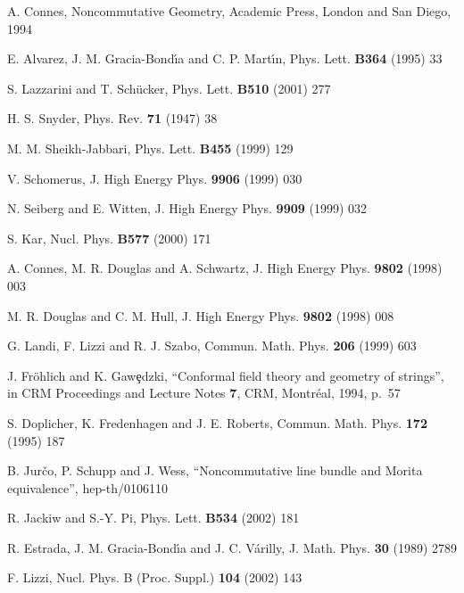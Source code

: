 \documentclass[a4paper,12pt]{article}
\providecommand{\1}{\mathbf{1}}         %
\providecommand{\7}{\dagger}            %
\providecommand{\8}{\bullet}            %
\renewcommand{\.}{\cdot}            %
\renewcommand{\:}{\colon}           %
\begin{document}
\begin{thebibliography}{92}
A. Connes,
Noncommutative Geometry,
Academic Press, London and San Diego, 1994

E. Alvarez, J. M. Gracia-Bond\'{\i}a and C. P. Mart\'{\i}n,
Phys. Lett. {\bf B364} (1995) 33

S. Lazzarini and T. Sch\"ucker,
Phys. Lett. {\bf B510} (2001) 277

H. S. Snyder,
Phys. Rev. {\bf 71} (1947) 38

M. M. Sheikh-Jabbari,
Phys. Lett. {\bf B455} (1999) 129

V. Schomerus,
J. High Energy Phys. {\bf 9906} (1999) 030

N. Seiberg and E. Witten,
J. High Energy Phys. {\bf 9909} (1999) 032

S. Kar,
Nucl. Phys. {\bf B577} (2000) 171

A. Connes, M. R. Douglas and A. Schwartz,
J. High Energy Phys. {\bf 9802} (1998) 003

M. R. Douglas and C. M. Hull,
J. High Energy Phys. {\bf 9802} (1998) 008

G. Landi, F. Lizzi and R. J. Szabo,
Commun. Math. Phys. {\bf 206} (1999) 603

J. Fr\"ohlich and K. Gaw\c{e}dzki,
``Conformal field theory and geometry of strings'',
in CRM Proceedings and Lecture Notes {\bf 7},
CRM, Montr\'eal, 1994, p.~57

S. Doplicher, K. Fredenhagen and J. E. Roberts,
Commun. Math. Phys. {\bf 172} (1995) 187

B. Jur\v{c}o, P. Schupp and J. Wess,
``Noncommutative line bundle and Morita equivalence'',
hep-th/0106110

R. Jackiw and S.-Y. Pi,
Phys. Lett. {\bf B534} (2002) 181

R. Estrada, J. M. Gracia-Bond\'{\i}a and J. C. V\'arilly,
J. Math. Phys. {\bf 30} (1989) 2789

F. Lizzi,
Nucl. Phys. B (Proc. Suppl.) {\bf 104} (2002) 143


\end{thebibliography}
\end{document}
